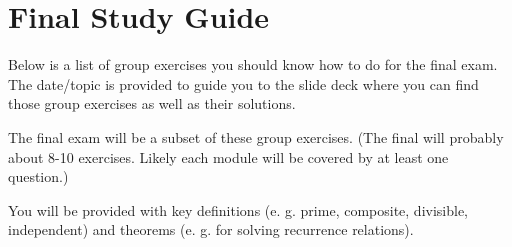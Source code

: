\documentclass[letterpaper]{inzane_syllabus} %
\begin{document}
\makeFullPage
\section{Final Study Guide}

Below is a list of group exercises you should know how to do for the final exam.  The date/topic is provided to guide you to the slide deck where you can find those group exercises as well as their solutions.   

The final exam will be a subset of these group exercises. (The final will probably about 8-10 exercises.  Likely each module will be covered by at least one question.)   

You will be provided with key definitions (e. g. prime, composite, divisible, independent) and theorems (e. g. for solving recurrence relations).  
 
\end{document}
